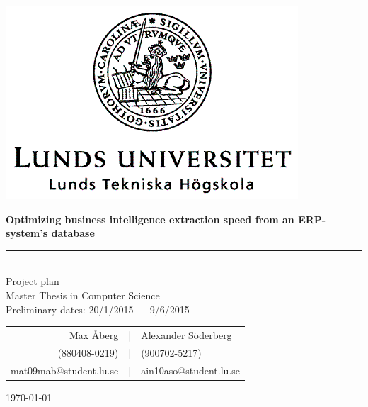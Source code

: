 \documentclass[12pt,a4paper]{article}
\newcommand{\HRule}{\rule{\linewidth}{0.5mm}}
\begin{document}
	\begin{titlepage}
  	\vspace*{3\baselineskip}
    \begin{center}
    	\begin{center}
    \includegraphics[scale=0.5]{Faculty_of_Engineering_(LTH),_Lund_University_logo.png}
    	\end{center}
    \vspace*{3\baselineskip}
    \large
    \bfseries
   \Huge
   Optimizing business intelligence extraction speed from an ERP-system's database
   \HRule\\
       \normalfont
          \LARGE
          Project plan \\
            \normalsize
            \vspace*{1\baselineskip}
      Master Thesis in  Computer Science\\
      \vspace*{4\baselineskip}
      Preliminary dates: 20/1/2015 --- 9/6/2015\\
      \vspace*{6\baselineskip}
      
      
      \begin{table}[H]
      \centering
      \begin{tabular}{r c l}
      Max Åberg &|& Alexander Söderberg\\
      (880408-0219) &|& (900702-5217) \\
      mat09mab@student.lu.se &|& ain10aso@student.lu.se\\
      \end{tabular}
      \end{table}

    
    

    \today \\

    \end{center}
\end{titlepage}
    
\end{document}
